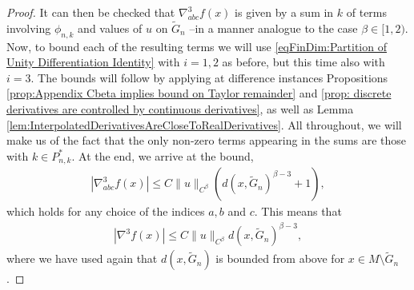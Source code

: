 \documentclass[11pt,reqno]{amsart}
\numberwithin{equation}{section}
\theoremstyle{plain}
\begin{document}
\begin{proof}
  It can then be checked that $\nabla^{3}_{abc}f(x)$ is given by a sum in $k$ of terms involving $\phi_{n,k}$ and values of $u$ on $\tilde G_n$ --in a manner analogue to the case $\beta \in [1,2)$. Now, to bound each of the resulting terms we will use \eqref{eqFinDim:Partition of Unity Differentiation Identity} with $i=1,2$ as before, but this time also with $i=3$. The bounds will follow by applying at difference instances Propositions \ref{prop:Appendix Cbeta implies bound on Taylor remainder} and \ref{prop: discrete derivatives are controlled by continuous derivatives}, as well as Lemma \ref{lem:InterpolatedDerivativesAreCloseToRealDerivatives}. All throughout, we will make us of the fact that the only non-zero terms appearing in the sums are those with $k\in P_{n,k}^*$. At the end, we arrive at the bound,
  \begin{align*} 
    |\nabla^3_{abc}f(x)|\leq C\|u\|_{C^\beta}(d(x,\tilde G_n)^{\beta-3}+1),
  \end{align*}	 
  which holds for any choice of the indices $a,b$ and $c$. This means that
  \begin{align*} 
    |\nabla^3 f(x)|\leq C\|u\|_{C^\beta}d(x,\tilde G_n)^{\beta-3},
  \end{align*}	 
  where we have used again that $d(x,\tilde G_n)$ is bounded from above for $x \in M \setminus \tilde G_n$.
\end{proof}



 


\end{document}

